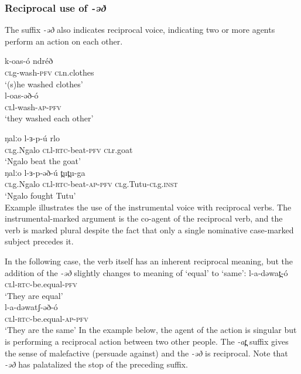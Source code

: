 \subsubsection{Reciprocal use of \textit{-əð}}
The suffix \textit{-əð} also indicates reciprocal voice, indicating two or more agents perform an action on each other. 

\ea
\ea \gll 	k-oas-ó 			ndréð	\\
	\textsc{cl}g-wash-\textsc{pfv} 	\textsc{cl}n.clothes\\
	\glt ‘(s)he washed clothes’\\

\ex \gll 	l-oas-əð-ó		\\
	\textsc{cl}l-wash-\textsc{ap-\textsc{pfv}} \\
	\glt ‘they washed each other’\\
\z
\z
	
\ea	
\ea \gll	 	ŋalːo 	     l-ɜ-p-ú 			rlo\\
	\textsc{cl}g.Ngalo  \textsc{cl}l-\textsc{rtc}-beat-\textsc{pfv} 	\textsc{cl}r.goat\\
	\glt ‘Ngalo beat the goat’\\ 

\ex \gll  	ŋalːo 	     l-ɜ-p-əð-ú 			t̪ut̪u-ga\\
	\textsc{cl}g.Ngalo  \textsc{cl}l-\textsc{rtc}-beat-\textsc{ap-\textsc{pfv}} 	\textsc{cl}g.Tutu-\textsc{cl}g.\textsc{inst}\\
	\glt ‘Ngalo fought Tutu’\\ \label{ex:ch11:recip}
\z
\z
Example  illustrates the use of the instrumental voice with reciprocal verbs. The instrumental-marked argument is the co-agent of the reciprocal verb, and the verb is marked plural despite the fact that only a single nominative case-marked subject precedes it.

In the following case, the verb itself has an inherent reciprocal meaning, but the addition of the \textit{-əð} slightly changes to meaning of `equal' to `same':
\ea
\ea \gll l-a-dəwat̪-ó\\
	\textsc{\textsc{cl}}l-\textsc{rtc}-be.equal-\textsc{pfv}\\ 	
	\glt ‘They are equal’\\

\ex \gll	l-a-dəwatʃ-əð-ó	\\
	\textsc{cl}l-\textsc{rtc}-be.equal-\textsc{ap-\textsc{pfv}} \\
	\glt ‘They are the same’
\z
\z
In the example below, the agent of the action is singular but is performing a reciprocal action between two other people. The \textit{-at̪} suffix gives the sense of malefactive (persuade against) and the \textit{-əð} is reciprocal. Note that \textit{-əð} has palatalized the stop of the preceding suffix. 


